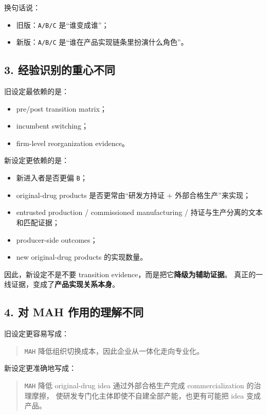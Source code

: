 \documentclass[12pt,fontset=none]{ctexart}
\begin{document}
换句话说：

\begin{itemize}[leftmargin=2em]
    \item 旧版：\texttt{A/B/C} 是“谁变成谁”；
    \item 新版：\texttt{A/B/C} 是“谁在产品实现链条里扮演什么角色”。
\end{itemize}

\subsection*{3. 经验识别的重心不同}

旧设定最依赖的是：

\begin{itemize}[leftmargin=2em]
    \item pre/post transition matrix；
    \item incumbent switching；
    \item firm-level reorganization evidence。
\end{itemize}

新设定更依赖的是：

\begin{itemize}[leftmargin=2em]
    \item 新进入者是否更偏 \texttt{B}；
    \item original-drug products 是否更常由“研发方持证 + 外部合格生产”来实现；
    \item entrusted production / commissioned manufacturing / 持证与生产分离的文本和匹配证据；
    \item producer-side outcomes；
    \item new original-drug products 的实现数量。
\end{itemize}

因此，新设定不是不要 transition evidence，而是把它\textbf{降级为辅助证据}。
真正的一线证据，变成了\textbf{产品实现关系本身}。

\subsection*{4. 对 MAH 作用的理解不同}

旧设定更容易写成：

\begin{quote}
\texttt{MAH} 降低组织切换成本，因此企业从一体化走向专业化。
\end{quote}

新设定更准确地写成：

\begin{quote}
\texttt{MAH} 降低 original-drug idea 通过外部合格生产完成 commercialization 的治理摩擦，
使研发专门化主体即使不自建全部产能，也更有可能把 idea 变成产品。
\end{quote}
\end{document}
